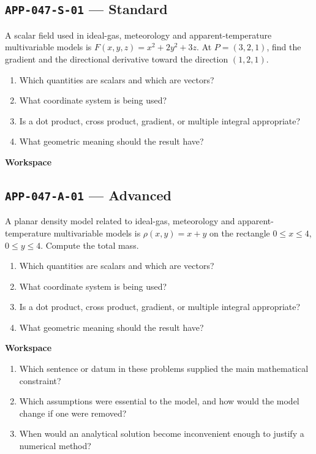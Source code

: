 \documentclass[11pt]{book}
\newcommand{\pid}[1]{\texttt{#1}}
\newcommand{\workspace}{\par\vspace{0.7in}\hrulefill\par\vspace{0.55in}\hrulefill\par}
\begin{document}
\subsection*{\pid{APP-047-S-01} — Standard}
\begin{problembox}
A scalar field used in ideal-gas, meteorology and apparent-temperature multivariable models is $F(x,y,z)=x^2+2y^2+3z$. At $P=(3,2,1)$, find the gradient and the directional derivative toward the direction $(1,2,1)$.
\end{problembox}
\begin{promptbox}\begin{enumerate}
\item Which quantities are scalars and which are vectors?
\item What coordinate system is being used?
\item Is a dot product, cross product, gradient, or multiple integral appropriate?
\item What geometric meaning should the result have?
\end{enumerate}\end{promptbox}
\textbf{Workspace}\workspace
{}
\subsection*{\pid{APP-047-A-01} — Advanced}
\begin{problembox}
A planar density model related to ideal-gas, meteorology and apparent-temperature multivariable models is $\rho(x,y)=x+y$ on the rectangle $0\le x\le 4$, $0\le y\le 4$. Compute the total mass.
\end{problembox}
\begin{promptbox}\begin{enumerate}
\item Which quantities are scalars and which are vectors?
\item What coordinate system is being used?
\item Is a dot product, cross product, gradient, or multiple integral appropriate?
\item What geometric meaning should the result have?
\end{enumerate}\end{promptbox}
\textbf{Workspace}\workspace
\begin{reflectionbox}\begin{enumerate}
\item Which sentence or datum in these problems supplied the main mathematical constraint?
\item Which assumptions were essential to the model, and how would the model change if one were removed?
\item When would an analytical solution become inconvenient enough to justify a numerical method?
\end{enumerate}\end{reflectionbox}
\end{document}

